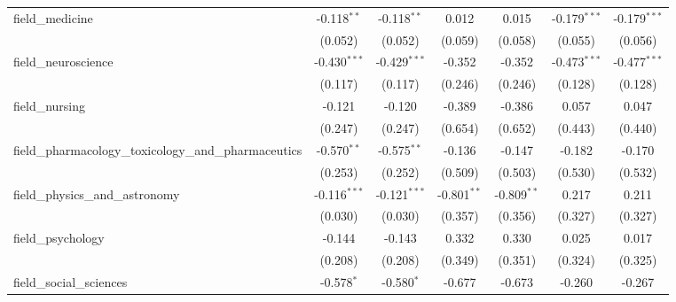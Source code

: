 \begin{tabular}{lcccccc}
   field\_medicine                                             & -0.118$^{**}$  & -0.118$^{**}$  & 0.012          & 0.015          & -0.179$^{***}$ & -0.179$^{***}$\\   
                                                               & (0.052)        & (0.052)        & (0.059)        & (0.058)        & (0.055)        & (0.056)\\   
   field\_neuroscience                                         & -0.430$^{***}$ & -0.429$^{***}$ & -0.352         & -0.352         & -0.473$^{***}$ & -0.477$^{***}$\\   
                                                               & (0.117)        & (0.117)        & (0.246)        & (0.246)        & (0.128)        & (0.128)\\   
   field\_nursing                                              & -0.121         & -0.120         & -0.389         & -0.386         & 0.057          & 0.047\\   
                                                               & (0.247)        & (0.247)        & (0.654)        & (0.652)        & (0.443)        & (0.440)\\   
   field\_pharmacology\_toxicology\_and\_pharmaceutics         & -0.570$^{**}$  & -0.575$^{**}$  & -0.136         & -0.147         & -0.182         & -0.170\\   
                                                               & (0.253)        & (0.252)        & (0.509)        & (0.503)        & (0.530)        & (0.532)\\   
   field\_physics\_and\_astronomy                              & -0.116$^{***}$ & -0.121$^{***}$ & -0.801$^{**}$  & -0.809$^{**}$  & 0.217          & 0.211\\   
                                                               & (0.030)        & (0.030)        & (0.357)        & (0.356)        & (0.327)        & (0.327)\\   
   field\_psychology                                           & -0.144         & -0.143         & 0.332          & 0.330          & 0.025          & 0.017\\   
                                                               & (0.208)        & (0.208)        & (0.349)        & (0.351)        & (0.324)        & (0.325)\\   
   field\_social\_sciences                                     & -0.578$^{*}$   & -0.580$^{*}$   & -0.677         & -0.673         & -0.260         & -0.267\\   

\end{tabular}
